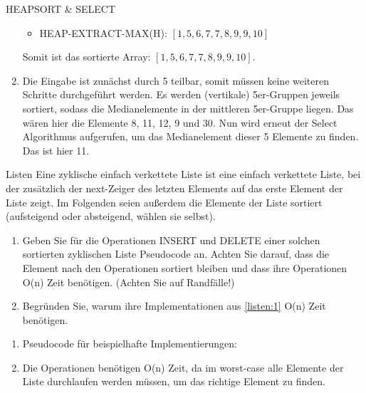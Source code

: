 \documentclass{article}
\begin{document}
\begin{exercise}{HEAPSORT \& SELECT}
\begin{solution}
\begin{enumerate}
\begin{itemize}
              \item HEAP-EXTRACT-MAX(H): $[1,5,6,7,7,8,9,9,10]$
            \end{itemize}
            Somit ist das sortierte Array: $[1,5,6,7,7,8,9,9,10]$.
      \item Die Eingabe ist zunächst durch 5 teilbar, somit müssen keine weiteren Schritte durchgeführt werden. Es werden (vertikale) 5er-Gruppen jeweils sortiert, sodass die Medianelemente in der mittleren 5er-Gruppe liegen. Das wären hier die Elemente 8, 11, 12, 9 und 30. Nun wird erneut der Select Algorithmus aufgerufen, um das Medianelement dieser 5 Elemente zu finden. Das ist hier 11.
    \end{enumerate}
  \end{solution}
\end{exercise}



\begin{exercise}{Listen}
  Eine zyklische einfach verkettete Liste ist eine einfach verkettete Liste, bei der zusätzlich der next-Zeiger des letzten Elements auf das erste Element der Liste zeigt. Im Folgenden seien außerdem die Elemente der Liste sortiert (aufsteigend oder absteigend, wählen sie selbst).
  \begin{enumerate}
    \item\label{listen:1} Geben Sie für die Operationen INSERT und DELETE einer solchen sortierten zyklischen Liste Pseudocode an. Achten Sie darauf, dass die Element nach den Operationen sortiert bleiben und dass ihre Operationen O(n) Zeit benötigen. (Achten Sie auf Randfälle!)
    \item Begründen Sie, warum ihre Implementationen aus \ref{listen:1} O(n) Zeit benötigen.
  \end{enumerate}

  \begin{solution}
    \begin{enumerate}
      \item Pseudocode für beispielhafte Implementierungen:\par
            
            

      \item Die Operationen benötigen O(n) Zeit, da im worst-case alle Elemente der Liste durchlaufen werden müssen, um das richtige Element zu finden.
    \end{enumerate}
  \end{solution}
\end{exercise}
\end{document}
